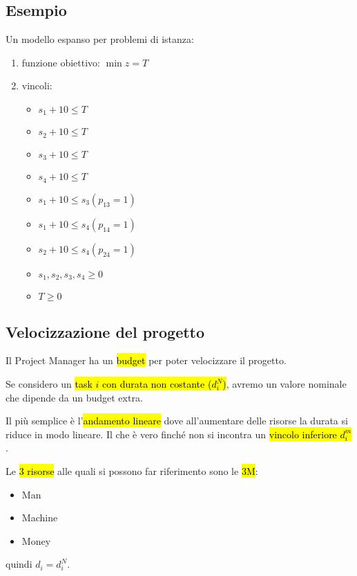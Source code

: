 \subsection{Esempio }

Un modello espanso per problemi di istanza:

\begin{enumerate}
	\item funzione obiettivo: $\min z = T$
	\item vincoli:
		\begin{itemize}
			\item $s_1 + 10 \leq T$
			\item $s_2 + 10 \leq T$
			\item $s_3 + 10 \leq T$
			\item $s_4 + 10 \leq T$
			\item $s_1 + 10 \leq s_3 (p_{13} = 1)$
			\item $s_1 + 10 \leq s_4 (p_{14} = 1)$
			\item $s_2 + 10 \leq s_4 (p_{24} = 1)$
			\item $s_1, s_2, s_3, s_4 \geq 0$
			\item $T \geq 0$
		\end{itemize}
\end{enumerate}


\subsection{Velocizzazione del progetto}

Il Project Manager ha un \hl{budget} per poter velocizzare il progetto.

Se considero un \hl{task $i$ con durata non costante ($d_i^N$)}, avremo un valore nominale che dipende da un budget extra.

Il più semplice è l'\hl{andamento lineare} dove all'aumentare delle risorse la durata si riduce in modo lineare. Il che è vero finché non si incontra un \hl{vincolo inferiore $d_i^m$}.


Le \hl{3 risorse} alle quali si possono far riferimento sono le \hl{3M}:

\begin{itemize}
	\item Man
	\item Machine
	\item Money
\end{itemize}


quindi $d_i = d_i^N$.


